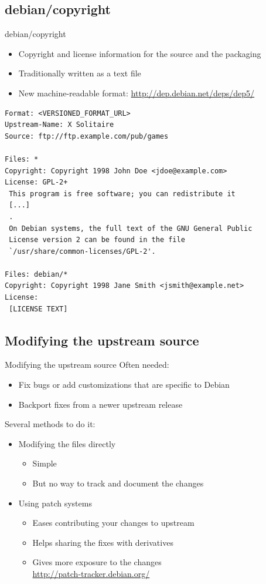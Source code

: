 \documentclass[10pt,final]{beamer}
\begin{document}
\subsection{debian/copyright}
\begin{frame}[fragile]{debian/copyright}
  \hbr
  \begin{itemize}
  \item Copyright and license information for the source and the packaging
  \item Traditionally written as a text file
  \item New machine-readable format: \url{http://dep.debian.net/deps/dep5/}
  \end{itemize}
  \seprule
  \begin{lstlisting}[basicstyle=\ttfamily\footnotesize]
Format: <VERSIONED_FORMAT_URL>
Upstream-Name: X Solitaire
Source: ftp://ftp.example.com/pub/games

Files: *
Copyright: Copyright 1998 John Doe <jdoe@example.com>
License: GPL-2+
 This program is free software; you can redistribute it
 [...]
 .
 On Debian systems, the full text of the GNU General Public
 License version 2 can be found in the file
 `/usr/share/common-licenses/GPL-2'.

Files: debian/*
Copyright: Copyright 1998 Jane Smith <jsmith@example.net>
License:
 [LICENSE TEXT]
\end{lstlisting}
\end{frame}



\subsection{Modifying the upstream source}
\begin{frame}{Modifying the upstream source}
  Often needed:
  \begin{itemize}
  \item Fix bugs or add customizations that are specific to Debian
    \hbr
  \item Backport fixes from a newer upstream release
  \end{itemize}
  \br
  Several methods to do it:
  \begin{itemize}
  \item Modifying the files directly
    \begin{itemize}
    \item Simple
    \item But no way to track and document the changes
    \end{itemize}
    \hbr
  \item Using patch systems
    \begin{itemize}
    \item Eases contributing your changes to upstream
    \item Helps sharing the fixes with derivatives
    \item Gives more exposure to the changes\\
      \url{http://patch-tracker.debian.org/}
    \end{itemize}
  \end{itemize}
\end{frame}
\end{document}
